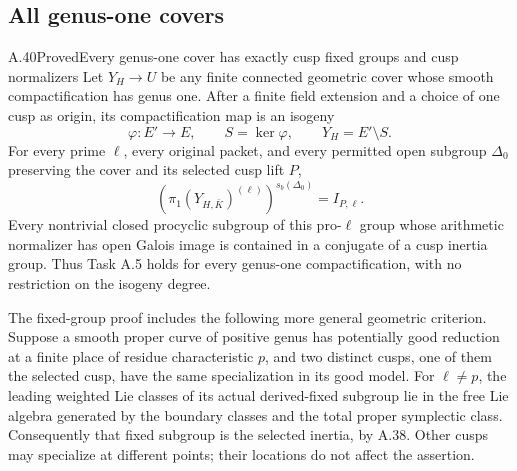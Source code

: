 \subsection{All genus-one covers}

\begin{statement}{A.40}{Proved}{Every genus-one cover has exactly cusp fixed groups and cusp normalizers}
Let \(Y_H\to U\) be any finite connected geometric cover
whose smooth compactification has genus one. After a finite
field extension and a choice of one cusp as origin, its
compactification map is an isogeny
\[
                \varphi:E'\longrightarrow E,
       \qquad S=\ker\varphi,
       \qquad Y_H=E'\setminus S.
\]
For every prime \(\ell\), every original packet, and every
permitted open subgroup \(\Delta_0\) preserving the cover
and its selected cusp lift \(P\),
\[
       \left(\pi_1(Y_{H,\bar K})^{(\ell)}\right)^{s_b(\Delta_0)}
                              =I_{P,\ell}.             \tag{A.40.1}
\]
Every nontrivial closed procyclic subgroup of this pro-\(\ell\)
group whose arithmetic normalizer has open Galois image is
contained in a conjugate of a cusp inertia group.
Thus Task A.5 holds for every genus-one compactification,
with no restriction on the isogeny degree.

The fixed-group proof includes the following more general
geometric criterion. Suppose a smooth proper curve of positive
genus has potentially good reduction at a finite place of
residue characteristic \(p\), and two distinct cusps, one of
them the selected cusp, have the same specialization in its
good model. For \(\ell\ne p\), the leading weighted Lie
classes of its actual derived-fixed subgroup lie in the free
Lie algebra generated by the boundary classes and the total
proper symplectic class. Consequently that fixed subgroup is
the selected inertia, by A.38. Other cusps may specialize at
different points; their locations do not affect the assertion.
\end{statement}

